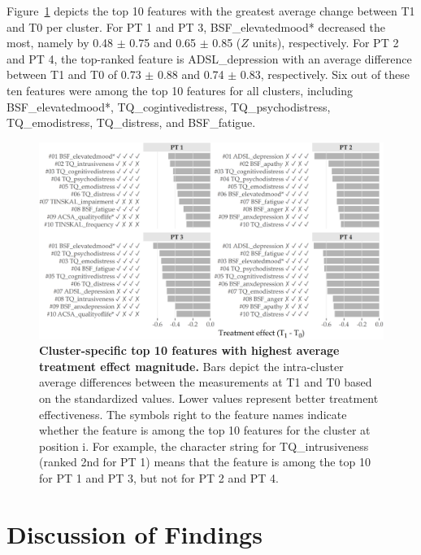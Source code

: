 \documentclass[
  oneside]{book}
\begin{document}
Figure~\ref{fig:05-treatment-effects} depicts the top 10 features with the greatest average change between T1 and T0 per cluster.
For PT 1 and PT 3, BSF\_elevatedmood* decreased the most, namely by 0.48 \(\pm\) 0.75 and 0.65 \(\pm\) 0.85 (\(Z\) units), respectively.
For PT 2 and PT 4, the top-ranked feature is ADSL\_depression with an average difference between T1 and T0 of 0.73 \(\pm\) 0.88 and 0.74 \(\pm\) 0.83, respectively.
Six out of these ten features were among the top 10 features for all clusters, including BSF\_elevatedmood*, TQ\_cogintivedistress, TQ\_psychodistress, TQ\_emodistress, TQ\_distress, and BSF\_fatigue.



\begin{figure}[htb]

{\centering \includegraphics[width=1\linewidth]{figures/05-treatment-effects} 

}

\caption{\textbf{Cluster-specific top 10 features with highest average treatment effect magnitude.} Bars depict the intra-cluster average differences between the measurements at T1 and T0 based on the standardized values. Lower values represent better treatment effectiveness. The symbols right to the feature names indicate whether the feature is among the top 10 features for the cluster at position i. For example, the character string     for TQ\_intrusiveness (ranked 2nd for PT 1) means that the feature is among the top 10 for PT 1 and PT 3, but not for PT 2 and PT 4.}\label{fig:05-treatment-effects}
\end{figure}

\hypertarget{phenotypes-discussion}{%
\section{Discussion of Findings}\label{phenotypes-discussion}}
\end{document}
